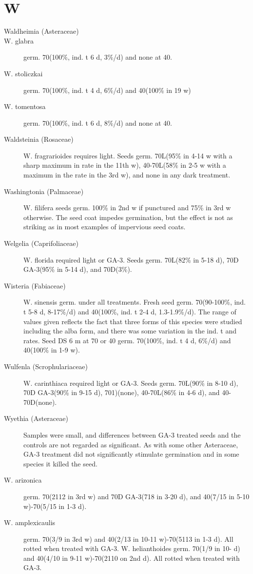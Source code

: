 \section{W}
\begin{description}
\item[Waldheimia (Asteraceae)]
\item[W. glabra] germ. 70(100\%, ind. t 6 d, 3\%/d) and none at 40.
\item[W. stoliczkai] germ. 70(100\%, ind. t 4 d, 6\%/d) and 40(100\% in 19 w)
\item[W. tomentosa] germ. 70(100\%, ind. t 6 d, 8\%/d) and none at 40.
\item[Waldsteinia (Rosaceae)] W. fragrarioides requires light. Seeds germ.
70L(95\% in 4-14 w with a sharp maximum in rate in the 11th w), 40-70L(58\% in 2-5 w
with a maximum in the rate in the 3rd w), and none in any dark treatment.
\item[Washingtonia (Palmaceae)] W. filifera seeds germ. 100\% in 2nd w if
punctured and 75\% in 3rd w otherwise. The seed coat impedes germination, but the
effect is not as striking as in most examples of impervious seed coats.
\item[Welgelia (Caprifoliaceae)] W. florida required light or GA-3. Seeds germ.
70L(82\% in 5-18 d), 70D GA-3(95\% in 5-14 d), and 70D(3\%).

\item[Wisteria (Fabiaceae)] W. sinensis germ. under all treatments. Fresh seed
germ. 70(90-100\%, ind. t 5-8 d, 8-17\%/d) and 40(100\%, ind. t 2-4 d, 1.3-1.9\%/d). The
range of values given reflects the fact that three forms of this species were studied
including the alba form, and there was some variation in the ind. t and rates. Seed DS
6 m at 70 or 40 germ. 70(100\%, ind. t 4 d, 6\%/d) and 40(100\% in 1-9 w).
\item[Wulfenla (Scrophulariaceae)] W. carinthiaca required light or GA-3.
Seeds germ. 70L(90\% in 8-10 d), 70D GA-3(90\% in 9-15 d), 701)(none), 40-70L(86\%
in 4-6 d), and 40-70D(none).

\item[Wyethia (Asteraceae)] Samples were small, and differences between GA-3
treated seeds and the controls are not regarded as significant. As with some other
Asteraceae, GA-3 treatment did not significantly stimulate germination and in some
species it killed the seed.
\item[W. arizonica] germ. 70(2112 in 3rd w) and 70D GA-3(718 in 3-20 d), and 40(7/15
in 5-10 w)-70(5/15 in 1-3 d).
\item[W. amplexicaulis] germ. 70(3/9 in 3rd w) and 40(2/13 in 10-11 w)-70(5113 in 1-3
d). All rotted when treated with GA-3.
W. helianthoides germ. 70(1/9 in 10- d) and 40(4/10 in 9-11 w)-70(2110 on 2nd
d). All rotted when treated with GA-3.
\end{description}

